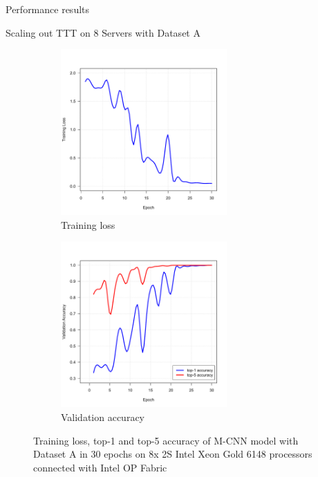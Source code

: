 \begin{section}{Performance results}
\begin{subsection}{Scaling out TTT on 8 Servers with Dataset A}
\begin{figure}
	\begin{subfigure}[b]{0.5\columnwidth}
		\centering
		\includegraphics[height=2.5in]{figure5a.pdf}
		\caption{Training loss}
		\label{fig:loss8node}
	\end{subfigure}
	\begin{subfigure}[b]{0.5\columnwidth}
		\centering
		\includegraphics[height=2.5in]{figure5b.pdf}
		\caption{Validation accuracy}
		\label{fig:accuracy8node}		
	\end{subfigure}
	\caption{\label{fig:8node}%
		\textsf{Training loss, top-1 and top-5 accuracy of M-CNN model with Dataset A in 30 epochs on 8x 2S Intel\textregistered{} Xeon\textregistered{} Gold 6148 processors connected with Intel\textregistered{} OP Fabric}}
\end{figure}


\end{subsection}
\end{section}
